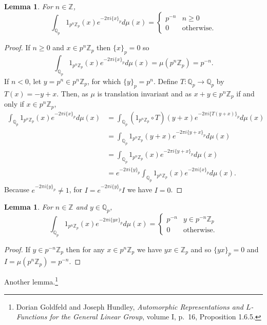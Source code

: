 \documentclass{article}
\newtheorem{lemma}[theorem]{Lemma}
\theoremstyle{definition}
\begin{document}
\begin{lemma}
For $n \in \mathbb{Z}$,
\[
\int_{\mathbb{Q}_p} 1_{p^n \mathbb{Z}_p}(x) e^{-2\pi i\{x\}_p} d\mu(x) = \begin{cases}
p^{-n}&n\geq 0\\
0&\textrm{otherwise}.
\end{cases}
\]
\label{nontrivial}
\end{lemma}
\begin{proof}
If $n \geq 0$ and $x \in p^n \mathbb{Z}_p$ then $\{x\}_p=0$ so  
\[
\int_{\mathbb{Q}_p} 1_{p^n \mathbb{Z}_p}(x) e^{-2\pi i\{x\}_p} d\mu(x) = \mu(p^n\mathbb{Z}_p) = p^{-n}.
\]
If $n<0$, let $y=p^n \in p^n \mathbb{Z}_p$, for which $\{y\}_p = p^{n}$.
Define $T:\mathbb{Q}_p \to \mathbb{Q}_p$ by $T(x)=-y+x$. Then, as $\mu$ is translation invariant
 and as $x+y \in p^n \mathbb{Z}_p$ if and only if $x \in p^n \mathbb{Z}_p$,
\begin{align*}
\int_{\mathbb{Q}_p} 1_{p^n \mathbb{Z}_p}(x) e^{-2\pi i\{x\}_p} d\mu(x) &=
\int_{\mathbb{Q}_p} (1_{p^n \mathbb{Z}_p} \circ T)(y+x) e^{-2\pi i\{T(y+x)\}_p} d\mu(x)\\
&=\int_{\mathbb{Q}_p} 1_{p^n \mathbb{Z}_p}(y+x) e^{-2\pi i\{y+x\}_p} d\mu(x)\\
&=\int_{\mathbb{Q}_p} 1_{p^n \mathbb{Z}_p}(x) e^{-2\pi i\{y+x\}_p} d\mu(x)\\
&=e^{-2\pi i\{y\}_p} \int_{\mathbb{Q}_p} 1_{p^n \mathbb{Z}_p}(x) e^{-2\pi i\{x\}_p} d\mu(x).
\end{align*}
Because $e^{-2\pi i\{y\}_p} \neq 1$, for $I= e^{-2\pi i\{y\}_p} I$ we have $I = 0$.
\end{proof}


\begin{lemma}
For $n \in \mathbb{Z}$ and $y \in \mathbb{Q}_p$,
\[
\int_{\mathbb{Q}_p} 1_{p^n \mathbb{Z}_p}(x) e^{-2\pi i\{yx\}_p} d\mu(x) = \begin{cases}
p^{-n}&y \in p^{-n}\mathbb{Z}_p\\
0&\textrm{otherwise}.
\end{cases}
\label{characters}
\]
\end{lemma}
\begin{proof}
If $y \in p^{-n} \mathbb{Z}_p$ then for any $x \in p^n\mathbb{Z}_p$ we have
$yx \in \mathbb{Z}_p$ and so $\{yx\}_p=0$ and $I=\mu(p^n\mathbb{Z}_p) = p^{-n}$.
\end{proof}

Another lemma.\footnote{Dorian Goldfeld and Joseph Hundley, {\em Automorphic Representations and $L$-Functions for the General Linear Group}, volume
I, p.~16, Proposition 1.6.5.}
 
\end{document}
